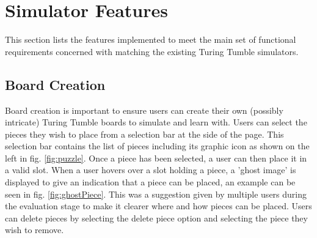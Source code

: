 \documentclass{l4proj}
\begin{document}


\section{Simulator Features}
This section lists the features implemented to meet the main set of functional requirements concerned with matching the existing Turing Tumble simulators.

\subsection{Board Creation}
Board creation is important to ensure users can create their own (possibly intricate) Turing Tumble boards to simulate and learn with. Users can select the pieces they wish to place from a selection bar at the side of the page. This selection bar contains the list of pieces including its graphic icon as shown on the left in fig. \ref{fig:puzzle}. Once a piece has been selected, a user can then place it in a valid slot. When a user hovers over a slot holding a piece, a 'ghost image' is displayed to give an indication that a piece can be placed, an example can be seen in fig. \ref{fig:ghostPiece}. This was a suggestion given by multiple users during the evaluation stage to make it clearer where and how pieces can be placed. Users can delete pieces by selecting the delete piece option and selecting the piece they wish to remove.
\end{document}
